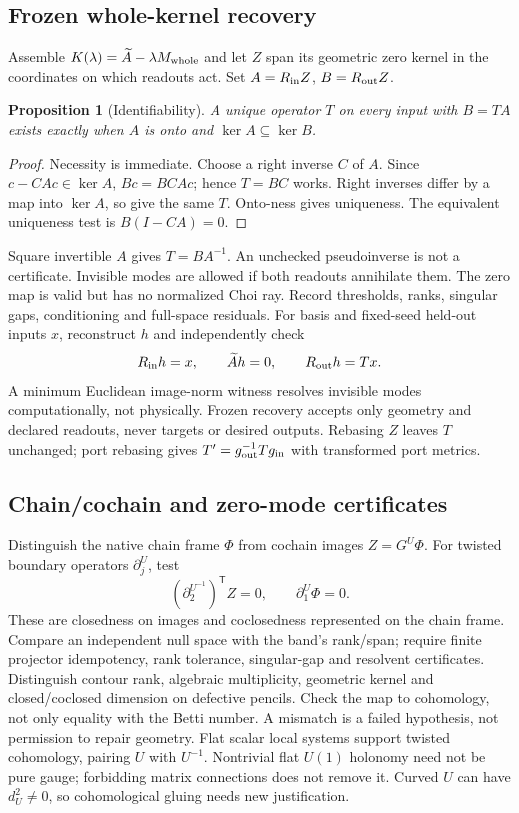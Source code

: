 \documentclass[11pt]{article}
\newtheorem{proposition}[theorem]{Proposition}
\theoremstyle{definition}
\theoremstyle{remark}
\begin{document}
\subsection{Frozen whole-kernel recovery}
Assemble $K(\lambda)=\widetilde A-\lambda M_{\rm whole}$ and let $Z$ span
its geometric zero kernel in the coordinates on which readouts act.
Set $A=R_{\rm in}Z$, $B=R_{\rm out}Z$.
\begin{proposition}[Identifiability]
A unique operator $T$ on every input with $B=TA$ exists exactly when
$A$ is onto and $\ker A\subseteq\ker B$.
\end{proposition}
\begin{proof}
Necessity is immediate. Choose a right inverse $C$ of $A$. Since
$c-CAc\in\ker A$, $Bc=BCAc$; hence $T=BC$ works. Right inverses differ
by a map into $\ker A$, so give the same $T$. Onto-ness gives uniqueness.
The equivalent uniqueness test is $B(I-CA)=0$.
\end{proof}
Square invertible $A$ gives $T=BA^{-1}$. An unchecked pseudoinverse is
not a certificate. Invisible modes are allowed if both readouts annihilate
them. The zero map is valid but has no normalized Choi ray.
Record thresholds, ranks, singular gaps, conditioning and full-space
residuals. For basis and fixed-seed held-out inputs $x$, reconstruct $h$
and independently check
\[
 R_{\rm in}h=x,\qquad \widetilde A h=0,\qquad R_{\rm out}h=Tx.
\]
A minimum Euclidean image-norm witness resolves invisible modes
computationally, not physically. Frozen recovery accepts only geometry
and declared readouts, never targets or desired outputs. Rebasing $Z$
leaves $T$ unchanged; port rebasing gives
$T'=g_{\rm out}^{-1}Tg_{\rm in}$ with transformed port metrics.

\subsection{Chain/cochain and zero-mode certificates}
Distinguish the native chain frame $\Phi$ from cochain images $Z=G^U\Phi$.
For twisted boundary operators $\partial_j^U$, test
\[
 (\partial_2^{U^{-1}})^{\mathsf T}Z=0,\qquad \partial_1^U\Phi=0 .
\]
These are closedness on images and coclosedness represented on the chain
frame. Compare an independent null space with the band's rank/span;
require finite projector idempotency, rank tolerance, singular-gap and
resolvent certificates. Distinguish contour rank, algebraic multiplicity,
geometric kernel and closed/coclosed dimension on defective pencils.
Check the map to cohomology, not only equality with the Betti number.
A mismatch is a failed hypothesis, not permission to repair geometry.
Flat scalar local systems support twisted cohomology, pairing $U$ with
$U^{-1}$. Nontrivial flat $U(1)$ holonomy need not be pure gauge;
forbidding matrix connections does not remove it. Curved $U$ can have
$d_U^2\ne0$, so cohomological gluing needs new justification.
\end{document}
